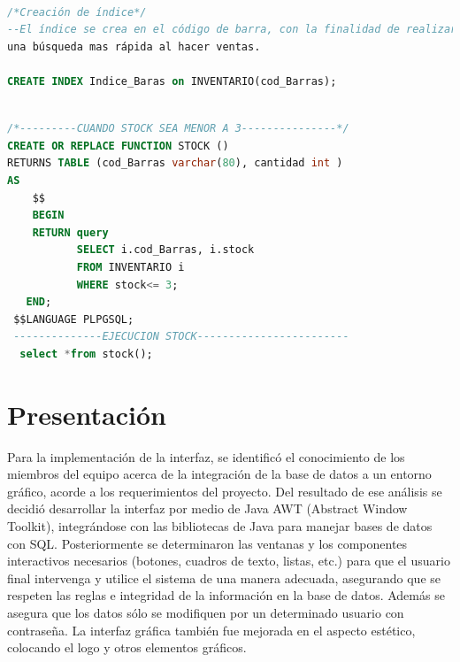 \documentclass[30pt,fleqn]{article}
\begin{document}
\vspace{15mm} %


\newpage

\begin{lstlisting}[language=sql, caption={Índice}]

/*Creación de índice*/
--El índice se crea en el código de barra, con la finalidad de realizar 
una búsqueda mas rápida al hacer ventas. 

CREATE INDEX Indice_Baras on INVENTARIO(cod_Barras);

\end{lstlisting}

\vspace{15mm} %

\begin{lstlisting}[language=sql, caption={Verificación de stock}]

/*---------CUANDO STOCK SEA MENOR A 3---------------*/
CREATE OR REPLACE FUNCTION STOCK ()
RETURNS TABLE (cod_Barras varchar(80), cantidad int )
AS 
	$$
	BEGIN 
	RETURN query 
	       SELECT i.cod_Barras, i.stock
		   FROM INVENTARIO i
		   WHERE stock<= 3;
   END;
 $$LANGUAGE PLPGSQL;
 --------------EJECUCION STOCK------------------------  
  select *from stock();

\end{lstlisting}


\newpage
\section{Presentación}

\vspace{5mm} %

Para la implementación de la interfaz, se identificó el conocimiento de los miembros del equipo acerca de la integración de la base de datos a un entorno gráfico, acorde a los requerimientos del proyecto. Del resultado de ese análisis se decidió desarrollar la interfaz por medio de Java AWT (Abstract Window Toolkit), integrándose con las bibliotecas de Java para manejar bases de datos con SQL.
Posteriormente se determinaron las ventanas y los componentes interactivos necesarios (botones, cuadros de texto, listas, etc.) para que el usuario final intervenga y utilice el sistema de una manera adecuada, asegurando que se respeten las reglas e integridad de la información en la base de datos. Además se asegura que los datos sólo se modifiquen por un determinado usuario con contraseña.  
La interfaz gráfica también fue mejorada en el aspecto estético, colocando el logo y otros elementos gráficos.
\end{document}
